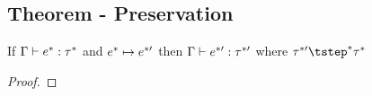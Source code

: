 \documentclass{article}
\begin{document}
\subsection{Theorem - Preservation}
If $\Gamma \vdash e^* : \tau^*$ and $e^* \mapsto e^{*\prime}$ then $\Gamma \vdash e^{*\prime} : \tau^{*\prime}$ where $\tau^{*\prime} \tstep^* \tau^*$
\begin{proof}
    
\end{proof}
\end{document}
